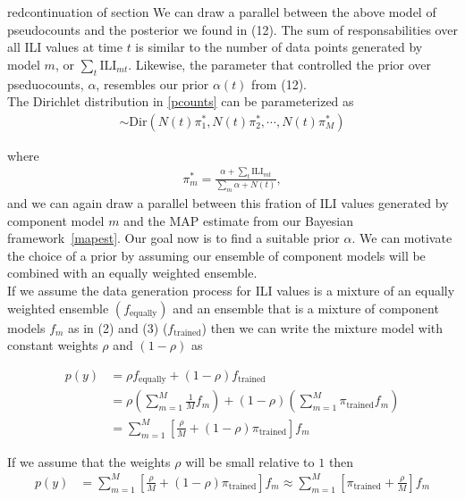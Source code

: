 \documentclass[
  fontsize=11pt,
  paper=a4,
  parskip=half,
  enlargefirstpage=on,    %
  fromalign=right,        %
  fromphone=on,           %
  fromrule=aftername,     %
  addrfield=on,           %
  backaddress=on,         %
  subject=beforeopening,  %
  locfield=narrow,        %
  foldmarks=on,           %
]{scrlttr2}
\def\l{\left}
\def\r{\right}
\newcommand{\f}{\frac}
\begin{document}
\begin{commt}{red}{continuation of section}
We can draw a parallel between the above model of pseudocounts and the posterior we found in (12).
The sum of responsabilities over all ILI values at time $t$ is similar to the number of data points generated by model $m$, or $\sum_{t} \text{ILI}_{mt}$.
Likewise, the parameter that controlled the prior over pseduocounts, $\alpha$, resembles our prior $\alpha(t)$ from (12).\\

The Dirichlet distribution in \eqref{pcounts} can be parameterized as
\begin{align}
  [\theta_{1},\theta_{2},\cdots,\theta_{M}] \sim \text{Dir}\l( N(t) \pi^{*}_{1},  N(t) \pi^{*}_{2}, \cdots,  N(t) \pi^{*}_{M}\r) \tag{22}\label{eq:22}
\end{align}

where
\begin{align}
  \pi^{*}_{m} = \f{ \alpha + \sum_{t} \text{ILI}_{mt} }{\sum_{m}\alpha + N(t)}, \tag{23}\label{eq:23}
\end{align}
and we can again draw a parallel between this fration of ILI values generated by component model $m$ and the MAP estimate from our Bayesian framework~\eqref{mapest}.
Our goal now is to find a suitable prior $\alpha$.
We can motivate the choice of a prior by assuming our ensemble of component models will be combined with an equally weighted ensemble.\\


If we assume the data generation process for ILI values is a mixture of an equally weighted ensemble $(f_{\text{equally}})$ and an ensemble that is a mixture of component models $f_{m}$ as in (2) and (3) ($f_{\text{trained}}$) then we can write the mixture model with constant weights $\rho$ and $(1-\rho)$ as

\begin{align*}
  p(y) &= \rho f_{\text{equally}} + (1-\rho)f_{\text{trained}}\\
       &= \rho \l( \sum_{m=1}^{M} \f{1}{M} f_{m} \r) + (1-\rho) \l( \sum_{m=1}^{M} \pi_{\text{trained}} f_{m} \r) \\
       &= \sum_{m=1}^{M} \l[ \f{\rho}{M} + (1-\rho) \pi_{\text{trained}} \r] f_{m}
\end{align*}

If we assume that the weights $\rho$ will be small relative to $1$ then
\begin{align*}
  p(y) &= \sum_{m=1}^{M} \l[ \f{\rho}{M} + (1-\rho) \pi_{\text{trained}} \r] f_{m}  \approx \sum_{m=1}^{M} \l[ \pi_{\text{trained}} + \f{\rho}{M} \r] f_{m} 
\end{align*}


\end{commt}
\end{document}
